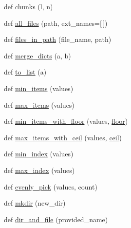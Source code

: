 \begin{DoxyCompactItemize}
\item 
def \hyperlink{namespacesylva_1_1misc_1_1util_aa202ba520fb5e2daa064c4379aeeb5cf}{chunks} (l, n)
\item 
def \hyperlink{namespacesylva_1_1misc_1_1util_a5dfe1979a130725652883d277a24ee5d}{all\+\_\+files} (path, ext\+\_\+names=\mbox{[}$\,$\mbox{]})
\item 
def \hyperlink{namespacesylva_1_1misc_1_1util_a7ad460a52be16d3083cb41f0be004714}{files\+\_\+in\+\_\+path} (file\+\_\+name, path)
\item 
def \hyperlink{namespacesylva_1_1misc_1_1util_a5cd57a1d193048a940df5f3795423f8c}{merge\+\_\+dicts} (a, b)
\item 
def \hyperlink{namespacesylva_1_1misc_1_1util_a03f5cfd365a10a5ec0567e320f987a9b}{to\+\_\+list} (a)
\item 
def \hyperlink{namespacesylva_1_1misc_1_1util_a7fdf694403cc19390b498aa430354a22}{min\+\_\+items} (values)
\item 
def \hyperlink{namespacesylva_1_1misc_1_1util_ab250130a1258b854bd002c06c3467f57}{max\+\_\+items} (values)
\item 
def \hyperlink{namespacesylva_1_1misc_1_1util_a54b027582331f484228cb0a1acac2d90}{min\+\_\+items\+\_\+with\+\_\+floor} (values, \hyperlink{namespacesylva_1_1misc_1_1util_aa02f5d131cb4bc9ad1c277a7b0c76885}{floor})
\item 
def \hyperlink{namespacesylva_1_1misc_1_1util_aea54b6ab8ee247ea3d042b09b5333c1c}{max\+\_\+items\+\_\+with\+\_\+ceil} (values, \hyperlink{namespacesylva_1_1misc_1_1util_ae24a7e9d1f4709e04a181e488d3e7e96}{ceil})
\item 
def \hyperlink{namespacesylva_1_1misc_1_1util_a167f655cf126d75c98e671a0672087ca}{min\+\_\+index} (values)
\item 
def \hyperlink{namespacesylva_1_1misc_1_1util_a32b5da1967e998035c511c75ccccdf89}{max\+\_\+index} (values)
\item 
def \hyperlink{namespacesylva_1_1misc_1_1util_a0881116abd7a50c6cd552b6b3edafea3}{evenly\+\_\+pick} (values, count)
\item 
def \hyperlink{namespacesylva_1_1misc_1_1util_af426e429c40209bbb46e3a0e8f139a44}{mkdir} (new\+\_\+dir)
\item 
def \hyperlink{namespacesylva_1_1misc_1_1util_a0ce6d1d719234031353b60ac60f2af0d}{dir\+\_\+and\+\_\+file} (provided\+\_\+name)
\end{DoxyCompactItemize}
